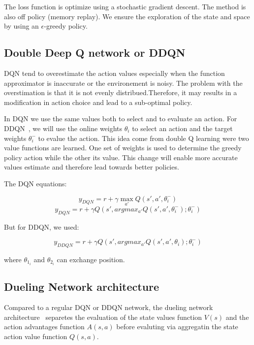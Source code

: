 \documentclass[12pt]{article}
\begin{document}
The loss function is optimize using a stochastic gradient descent.
The method is also off policy (memory replay). We ensure the exploration of the state and space by using an $\epsilon$-greedy policy.


\subsection*{Double Deep Q network or DDQN}
DQN tend to overestimate the action values especially when the function approximator is inaccurate or the environement is noisy. The problem with the overstimation is that it is not evenly distribued.Therefore, it may results in a modification in action choice and lead to a sub-optimal policy.

In DQN we use the same values both to select and to evaluate an action. For DDQN~\cite{Hasselt2016}, we will use the online weights $\theta_i$ to select an action and the target weights $\theta_i^-$ to evalue the action. 
This idea come from double Q learning were two value functions are learned.
One set of weights is used to determine the greedy policy action while the other its value.
This change will enable more accurate values estimate and therefore lead towards better policies.

The DQN equations:

\begin{equation}
	y_{DQN}=r+\gamma \max_{a'} Q(s',a',\theta_i^-)
\end{equation}
\begin{equation}
	y_{DQN}=r+\gamma Q(s',argmax_{a'} Q(s',a',\theta_i^-);\theta_i^-)
\end{equation}

But for DDQN, we used:

\begin{equation}
	y_{DDQN}=r+\gamma Q(s',argmax_{a'} Q(s',a',\theta_i);\theta_i^-)
\end{equation}

where $\theta_{1_{i}}$ and $\theta_{2_{i}}$ can exchange position.

\subsection*{Dueling Network architecture}
Compared to a regular DQN or DDQN network, the dueling network architecture~\cite{BellemareDM17} separetes the evaluation of the state values function $V(s)$ and the action advantages function $A(s,a)$ before evaluting via aggregatin the state action value function $Q(s,a)$.
\end{document}
